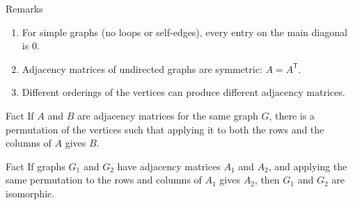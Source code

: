 \documentclass[aspectratio=169,11pt]{beamer}
\begin{document}
\begin{frame}{Remarks}
\normalsize
\begin{enumerate}
  \setlength{\itemsep}{0.16cm}
  \item For simple graphs (no loops or self-edges), every entry on the main diagonal is $0$.
  \item Adjacency matrices of undirected graphs are symmetric: $A=A^{\mathsf T}$.
  \item Different orderings of the vertices can produce different adjacency matrices.
\end{enumerate}

\vspace{0.18cm}
\begin{block}{Fact}
If $A$ and $B$ are adjacency matrices for the same graph $G$, there is a permutation of the vertices such that applying it to both the rows and the columns of $A$ gives $B$.
\end{block}

\vspace{0.12cm}
\begin{block}{Fact}
If graphs $G_1$ and $G_2$ have adjacency matrices $A_1$ and $A_2$, and applying the same permutation to the rows and columns of $A_1$ gives $A_2$, then $G_1$ and $G_2$ are isomorphic.
\end{block}
\end{frame}
\end{document}
